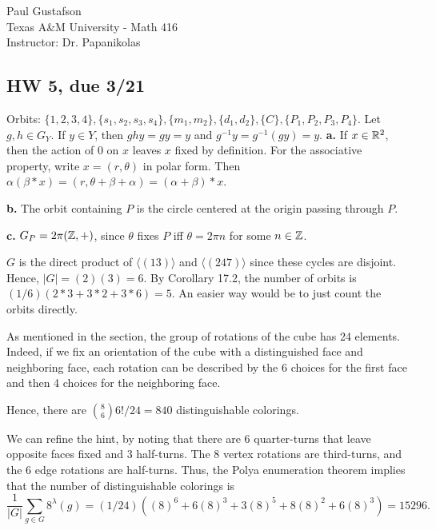 \documentclass{article}
\begin{document}
\noindent Paul Gustafson\\
\noindent Texas A\&M University - Math 416\\
\noindent Instructor: Dr. Papanikolas

\subsection*{HW 5, due 3/21}


 Orbits: $\{1,2,3,4\}, \{s_1, s_2, s_3, s_4\}, \{m_1, m_2\}, \{d_1, d_2\},
\{C\}, \{P_1, P_2, P_3, P_4\}$.
  Let $g,h \in G_Y$. If $y \in Y$, then $ghy = gy = y$ and $g^{-1}y = g^{-1}(gy) = y$.
 \textbf{a.} If $x \in \mathbb{R}^2$, then the action of $0$ on $x$ leaves $x$ fixed by definition.  For the associative property, write $x = (r,\theta)$ in polar form.  Then $\alpha(\beta * x) = (r, \theta + \beta + \alpha) 
= (\alpha +\beta) * x$.

\textbf{b.} The orbit containing $P$ is the circle centered at the origin passing through $P$.

\textbf{c.} $G_P = 2\pi(\mathbb{Z},+)$, since $\theta$ fixes $P$ iff $\theta = 2\pi n$ for some $n \in \mathbb{Z}$.

 $G$ is the direct product of $\langle (1 3) \rangle$ and $\langle (2 4 7) \rangle$ since these cycles are disjoint.  Hence, $|G| = (2)(3) = 6$.
By Corollary 17.2, the number of orbits is $(1/6)(2*3 + 3*2 + 3*6) = 5$. An easier way would be to just count the orbits directly.

 As mentioned in the section, the group of rotations of the cube has 24 elements. Indeed, if we fix an orientation of the cube with a distinguished face and neighboring face, each rotation can be described by the 6 choices for the first face and then 4 choices for the neighboring face.

Hence, there are ${8 \choose 6} 6!/24 = 840$ distinguishable colorings.

 We can refine the hint, by noting that there are 6 quarter-turns that leave opposite faces fixed and 3 half-turns. The 8 vertex rotations are third-turns, and the 6 edge rotations are half-turns. Thus, the Polya enumeration theorem implies that the number of distinguishable colorings is
$$ \frac 1 {|G|} \sum_{g \in G} 8^\lambda(g) = (1/24) ((8)^6 + 6(8)^3 + 3(8)^5 + 8(8)^2 + 6(8)^3) = 15296.$$
\end{document}
